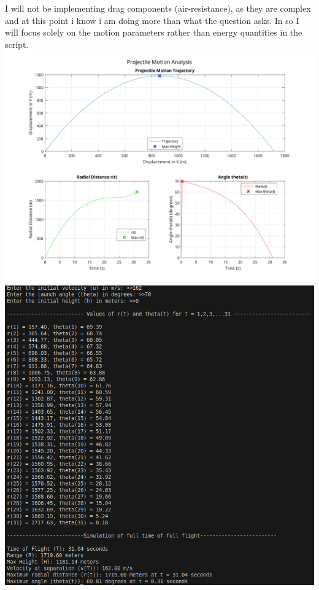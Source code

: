 \documentclass[a4paper, 12pt]{report}
\def\link{blue!50!black}
\begin{document}
    I will not be implementing drag components (air-resistance), as they are complex and at this point i know i am doing more than what the question asks. In so I will focus solely on the motion parameters rather than energy quantities in the script.\\[2em]
    

    \includegraphics[width=1\textwidth]{images/Projectile_motion.png}
    \includegraphics[width=1\textwidth]{images/q5cmd.png}
    
\end{document}

